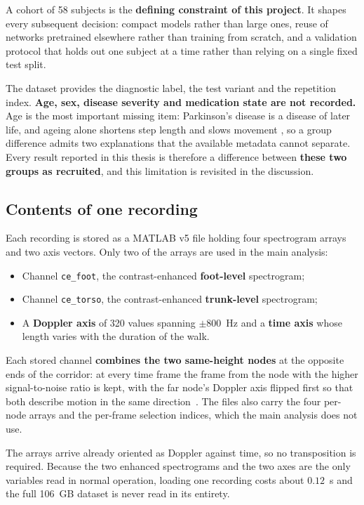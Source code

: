 A cohort of 58 subjects is the \textbf{defining constraint of this project}. It
shapes every subsequent decision: compact models rather than large ones, reuse of
networks pretrained elsewhere rather than training from scratch, and a validation
protocol that holds out one subject at a time rather than relying on a single
fixed test split.

The dataset provides the diagnostic label, the test variant and the repetition
index. \textbf{Age, sex, disease severity and medication state are not
recorded.} Age is the most important missing item: Parkinson's disease is a
disease of later life, and ageing alone shortens step length and slows movement
\cite{mirelman2019}, so a group difference admits two explanations that the
available metadata cannot separate. Every result reported in this thesis is
therefore a difference between \textbf{these two groups as recruited}, and this
limitation is revisited in the discussion.

\subsection{Contents of one recording}

Each recording is stored as a MATLAB v5 file holding four spectrogram arrays and
two axis vectors. Only two of the arrays are used in the main analysis:

\begin{itemize}
  \item Channel \texttt{ce\_foot}, the contrast-enhanced \textbf{foot-level}
        spectrogram;
  \item Channel \texttt{ce\_torso}, the contrast-enhanced \textbf{trunk-level}
        spectrogram;
  \item A \textbf{Doppler axis} of 320 values spanning $\pm 800$~Hz and a
        \textbf{time axis} whose length varies with the duration of the walk.
\end{itemize}

\noindent Each stored channel \textbf{combines the two same-height nodes} at
the opposite ends of the corridor: at every time frame the frame from the
node with the higher signal-to-noise ratio is kept, with the far node's
Doppler axis flipped first so that both describe motion in the same
direction~\cite{lopezdelgado2026}. The files also carry the four per-node
arrays and the per-frame selection indices, which the main analysis does not
use.

\noindent The arrays arrive already oriented as Doppler against time, so no
transposition is required. Because the two enhanced spectrograms and the two axes
are the only variables read in normal operation, loading one recording costs
about $0.12$~s and the full 106~GB dataset is never read in its entirety.

